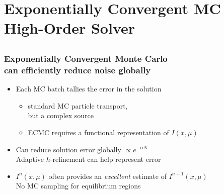 \documentclass[xcolor=dvipsnames,hyperref={pdfpagelabels=false},unknownkeysallowed,
handout]{beamer}
\newcommand{\colb}[1]{{\color{blue} #1}}
\newcommand{\colG}[1]{{\color{Gray!110} #1}}
\newcommand{\colr}[1]{{\color{red} #1}}
\newlength{\wideitemsep}
\let\olditem\item
\renewcommand{\item}{\setlength{\itemsep}{\wideitemsep}\olditem}
\begin{document}
\section{Exponentially Convergent MC High-Order Solver}
\subsection{}

{\addtolength\leftmargini{-0.165in}
\begin{frame}
    \frametitle{Exponentially Convergent Monte Carlo \\ can efficiently reduce noise globally}
    \begin{itemize}
            \addtolength{\wideitemsep}{0.14in}
        \item[] Each MC batch tallies the \colb{error} in the solution 
            \begin{itemize}
                \item \colG{standard MC particle transport,\\ but a \colr{complex} source}
                    \vspace{-0.21in}
                \item \colG{ECMC requires  a \colr{functional} representation of $I(x,\mu)$}
    \end{itemize}

        \item[] Can reduce solution error \colb{globally} $\propto e^{-\alpha N}$ \\
            \colG{Adaptive $h$-refinement can help represent error}
        \item[] $I^{n}(x,\mu)$ often provides an \emph{excellent} estimate of
            $I^{n+1}(x,\mu)$\\  \colG{No MC sampling for equilibrium regions}
     \end{itemize}
 \end{frame}
 }
\end{document}

